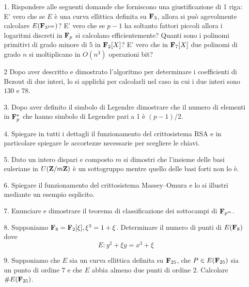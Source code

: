 \item{1.} Rispondere alle seguenti domande che forniscono una giustificazione di 1 riga:
 E' vero che se $E$ \`e una curva ellittica definita su ${\bf F}_{3}$, allora
si pu\`o agevolmente calcolare $E({\bf F}_{3^{100}})$?
 E' vero che se $p-1$ ha soltanto fattori piccoli allora i logaritmi discreti in ${\bf F}_p$ si
calcolano efficientemente?
 Quanti sono i polinomi primitivi di grado minore di $5$ in ${\bf F}_2[X]$?
 E' vero che in ${\bf F}_7[X]$ due polinomi di grado $n$ si moltiplicano in $O(n^3)$ operazioni bit?
\item{2} Dopo aver descritto e dimostrato l'algoritmo per determinare i coefficienti di Bezout di due interi, lo si applichi per
calcolarli nel caso in cui i due interi sono $130$ e $78$.
\item{3.} Dopo aver definito il simbolo di Legendre dimostrare che il numero di elementi in ${\bf F}_p^*$ che
hanno simbolo di Legendre pari a 1 \`e $(p-1)/2$.
\item{4.} Spiegare in tutti i dettagli il funzionamento del crittosistema RSA e in particolare spiegare le accortezze
necessarie per scegliere le chiavi.
\item{5.} Dato un intero dispari e composto $m$ si dimostri che l'insieme delle basi euleriane in $U({\bf Z}/m{\bf Z})$ \`e
un sottogruppo mentre quello delle basi forti non lo \`e.
\item{6.} Spiegare il funzionamento del crittosistema Massey--Omura e lo si illustri mediante un esempio esplicito.
\item{7.} Enunciare e dimostrare il teorema di classificazione dei sottocampi di ${\bf F}_{p^m}$.
\item{8.} Supponiamo ${\bf F}_8={\bf F}_2[\xi], \xi^3=1+\xi$. 
Determinare il numero di punti di $E({\bf F}_8)$ dove 
$$E: y^2+\xi y=x^3+\xi$$
\item{9.} Supponiamo che $E$ sia un curva ellittica definita su ${\bf F}_{25}$, che $P\in E({\bf F}_{25})$ sia un punto di
ordine $7$ e che $E$ abbia almeno due punti di ordine $2$. Calcolare $\#E({\bf F}_{25})$.
\bigskip

